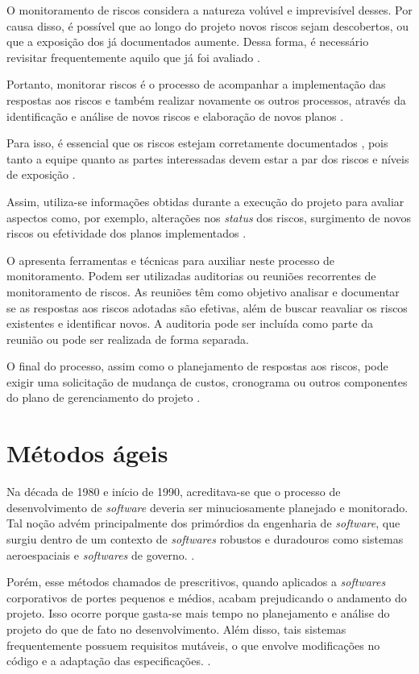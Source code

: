 \documentclass[
    12pt,       %
    openright,      %
    twoside,      %
    a4paper,      %
    english,      %
    french,       %
    spanish,      %
    brazil,       %
    ]{abntex2}
\begin{document}
O monitoramento de riscos considera a natureza volúvel e imprevisível desses. Por causa disso, é possível que ao longo do projeto novos riscos sejam descobertos, ou que a exposição dos já documentados aumente. Dessa forma, é necessário revisitar frequentemente aquilo que já foi avaliado \cite{WAZLAWICK:2013}.

Portanto, monitorar riscos é o processo de acompanhar a implementação das respostas aos riscos e também realizar novamente os outros processos, através da identificação e análise de novos riscos e elaboração de novos planos \cite{PMBOK:2017}.

Para isso, é essencial que os riscos estejam corretamente documentados \cite{WAZLAWICK:2013}, pois tanto a equipe quanto as partes interessadas devem estar a par dos riscos e níveis de exposição \cite{PMBOK:2017}. 

Assim, utiliza-se informações obtidas durante a execução do projeto para avaliar aspectos como, por exemplo, alterações nos \textit{status} dos riscos, surgimento de novos riscos ou efetividade dos planos implementados \cite{PMBOK:2017}.

O \cite{PMBOK:2017} apresenta ferramentas e técnicas para auxiliar neste processo de monitoramento. Podem ser utilizadas auditorias ou reuniões recorrentes de monitoramento de riscos. As reuniões têm como objetivo analisar e documentar se as respostas aos riscos adotadas são efetivas, além de buscar reavaliar os riscos existentes e identificar novos. A auditoria pode ser incluída como parte da reunião ou pode ser realizada de forma separada. 

O final do processo, assim como o planejamento de respostas aos riscos, pode exigir uma solicitação de mudança de custos, cronograma ou outros componentes do plano de gerenciamento do projeto \cite{PMBOK:2017}.

\section{Métodos ágeis}

Na década de 1980 e início de 1990, acreditava-se que o processo de desenvolvimento de \textit{software} deveria ser minuciosamente planejado e monitorado. Tal noção advém principalmente dos primórdios da engenharia de \textit{software}, que surgiu dentro de um contexto de \textit{softwares} robustos e duradouros como sistemas aeroespaciais e \textit{softwares} de governo. \cite{SOMMERVILLE:2011}.

Porém, esse métodos chamados de prescritivos, quando aplicados a \textit{softwares} corporativos de portes pequenos e médios, acabam prejudicando o andamento do projeto. Isso ocorre porque gasta-se mais tempo no planejamento e análise do projeto do que de fato no desenvolvimento. Além disso, tais sistemas frequentemente possuem requisitos mutáveis, o que envolve modificações no código e a adaptação das especificações. \cite{SOMMERVILLE:2011}.
\end{document}
